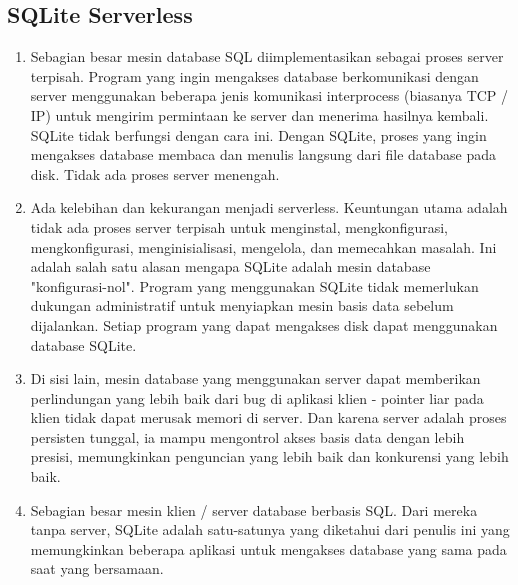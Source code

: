 	\subsection{SQLite Serverless}
		\begin{enumerate}
			\item Sebagian besar mesin database SQL diimplementasikan sebagai proses server terpisah. Program yang ingin mengakses database berkomunikasi dengan server menggunakan beberapa jenis komunikasi interprocess (biasanya TCP / IP) untuk mengirim permintaan ke server dan menerima hasilnya kembali. SQLite tidak berfungsi dengan cara ini. Dengan SQLite, proses yang ingin mengakses database membaca dan menulis langsung dari file database pada disk. Tidak ada proses server menengah.
			\item Ada kelebihan dan kekurangan menjadi serverless. Keuntungan utama adalah tidak ada proses server terpisah untuk menginstal, mengkonfigurasi, mengkonfigurasi, menginisialisasi, mengelola, dan memecahkan masalah. Ini adalah salah satu alasan mengapa SQLite adalah mesin database "konfigurasi-nol". Program yang menggunakan SQLite tidak memerlukan dukungan administratif untuk menyiapkan mesin basis data sebelum dijalankan. Setiap program yang dapat mengakses disk dapat menggunakan database SQLite.
			\item Di sisi lain, mesin database yang menggunakan server dapat memberikan perlindungan yang lebih baik dari bug di aplikasi klien - pointer liar pada klien tidak dapat merusak memori di server. Dan karena server adalah proses persisten tunggal, ia mampu mengontrol akses basis data dengan lebih presisi, memungkinkan penguncian yang lebih baik dan konkurensi yang lebih baik.
			\item Sebagian besar mesin klien / server database berbasis SQL. Dari mereka tanpa server, SQLite adalah satu-satunya yang diketahui dari penulis ini yang memungkinkan beberapa aplikasi untuk mengakses database yang sama pada saat yang bersamaan.
		\end{enumerate}
